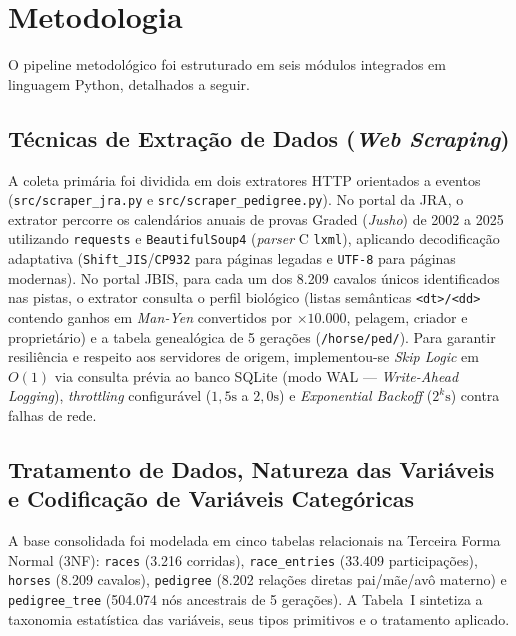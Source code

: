\documentclass[conference]{IEEEtran}
\begin{document}
\section{Metodologia}
O pipeline metodológico foi estruturado em seis módulos integrados em linguagem Python, detalhados a seguir.

\subsection{Técnicas de Extração de Dados (\textit{Web Scraping})}
A coleta primária foi dividida em dois extratores HTTP orientados a eventos (\texttt{src/scraper\_jra.py} e \texttt{src/scraper\_pedigree.py}). No portal da JRA, o extrator percorre os calendários anuais de provas Graded (\textit{Jusho}) de 2002 a 2025 utilizando \texttt{requests} e \texttt{BeautifulSoup4} (\textit{parser} C \texttt{lxml}), aplicando decodificação adaptativa (\texttt{Shift\_JIS}/\texttt{CP932} para páginas legadas e \texttt{UTF-8} para páginas modernas). No portal JBIS, para cada um dos 8.209 cavalos únicos identificados nas pistas, o extrator consulta o perfil biológico (listas semânticas \texttt{<dt>/<dd>} contendo ganhos em \textit{Man-Yen} convertidos por $\times 10.000$, pelagem, criador e proprietário) e a tabela genealógica de 5 gerações (\texttt{/horse/ped/}). Para garantir resiliência e respeito aos servidores de origem, implementou-se \textit{Skip Logic} em $O(1)$ via consulta prévia ao banco SQLite (modo WAL --- \textit{Write-Ahead Logging}), \textit{throttling} configurável ($1,5\text{s}$ a $2,0\text{s}$) e \textit{Exponential Backoff} ($2^k\text{s}$) contra falhas de rede.

\subsection{Tratamento de Dados, Natureza das Variáveis e Codificação de Variáveis Categóricas}
A base consolidada foi modelada em cinco tabelas relacionais na Terceira Forma Normal (3NF): \texttt{races} (3.216 corridas), \texttt{race\_entries} (33.409 participações), \texttt{horses} (8.209 cavalos), \texttt{pedigree} (8.202 relações diretas pai/mãe/avô materno) e \texttt{pedigree\_tree} (504.074 nós ancestrais de 5 gerações). A Tabela~I sintetiza a taxonomia estatística das variáveis, seus tipos primitivos e o tratamento aplicado.
\end{document}

